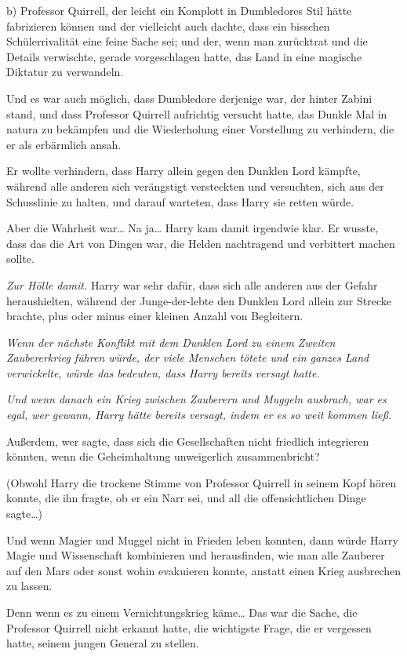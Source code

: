 {b) Professor Quirrell, der leicht ein Komplott in Dumbledores Stil hätte fabrizieren können und der vielleicht auch dachte, dass ein bisschen Schülerrivalität eine feine Sache sei; und der, wenn man zurücktrat und die Details verwischte, gerade vorgeschlagen hatte, das Land in eine magische Diktatur zu verwandeln.

Und es war auch möglich, dass Dumbledore derjenige war, der hinter Zabini stand, und dass Professor Quirrell aufrichtig versucht hatte, das Dunkle Mal in natura zu bekämpfen und die Wiederholung einer Vorstellung zu verhindern, die er als erbärmlich ansah.

Er wollte verhindern, dass Harry allein gegen den Dunklen Lord kämpfte, während alle anderen sich verängstigt versteckten und versuchten, sich aus der Schusslinie zu halten, und darauf warteten, dass Harry sie retten würde.

Aber die Wahrheit war… Na ja… Harry kam damit irgendwie klar. Er wusste, dass das die Art von Dingen war, die Helden nachtragend und verbittert machen sollte.

\emph{Zur Hölle damit.} Harry war sehr dafür, dass sich alle anderen aus der Gefahr heraushielten, während der Junge-der-lebte den Dunklen Lord allein zur Strecke brachte, plus oder minus einer kleinen Anzahl von Begleitern.

\emph{Wenn der nächste Konflikt mit dem Dunklen Lord zu einem Zweiten Zaubererkrieg führen würde, der viele Menschen tötete und ein ganzes Land verwickelte, würde das bedeuten, dass Harry bereits versagt hatte.}

\emph{\hfill\break Und wenn danach ein Krieg zwischen Zauberern und Muggeln ausbrach, war es egal, wer gewann, Harry hätte bereits versagt, indem er es so weit kommen ließ.}

Außerdem, wer sagte, dass sich die Gesellschaften nicht friedlich integrieren könnten, wenn die Geheimhaltung unweigerlich zusammenbricht?

(Obwohl Harry die trockene Stimme von Professor Quirrell in seinem Kopf hören konnte, die ihn fragte, ob er ein Narr sei, und all die offensichtlichen Dinge sagte…)

Und wenn Magier und Muggel nicht in Frieden leben konnten, dann würde Harry Magie und Wissenschaft kombinieren und herausfinden, wie man alle Zauberer auf den Mars oder sonst wohin evakuieren konnte, anstatt einen Krieg ausbrechen zu lassen.

Denn wenn es zu einem Vernichtungskrieg käme… Das war die Sache, die Professor Quirrell nicht erkannt hatte, die wichtigste Frage, die er vergessen hatte, seinem jungen General zu stellen.

}
